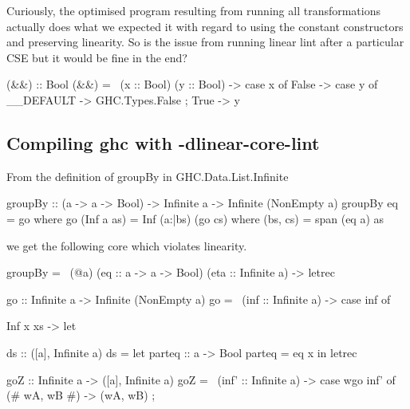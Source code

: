 \documentclass[a4paper, draft]{article}
\begin{document}
\begin{code}
Curiously, the optimised program resulting from running all transformations
actually does what we expected it with regard to using the constant constructors
and preserving linearity. So is the issue from running linear lint after a
particular CSE but it would be fine in the end?
\begin{code}
(&&) :: Bool %
(&&) = \ (x :: Bool) (y :: Bool) ->
  case x of {
    False -> case y of { __DEFAULT -> GHC.Types.False };
    True -> y
  }
\end{code}

\subsection{Compiling ghc with -dlinear-core-lint}

From the definition of groupBy in GHC.Data.List.Infinite
\begin{code}
groupBy :: (a -> a -> Bool) -> Infinite a -> Infinite (NonEmpty a)
groupBy eq = go
  where
    go (Inf a as) = Inf (a:|bs) (go cs)
      where (bs, cs) = span (eq a) as
\end{code}
we get the following core which violates linearity.
\begin{code}
groupBy = \ (@a) (eq :: a -> a -> Bool) (eta :: Infinite a) ->
  letrec {
    go :: Infinite a -> Infinite (NonEmpty a)
    go = \ (inf :: Infinite a) -> case inf of {
      Inf x xs -> let {
        ds :: ([a], Infinite a)
        ds = let {
            parteq :: a -> Bool
            parteq = eq x
        } in
          letrec {
            goZ :: Infinite a -> ([a], Infinite a)
            goZ = \ (inf' :: Infinite a) -> case wgo inf' of { (# wA, wB #) -> (wA, wB) };

}}}}
\end{code}
\end{code}
\end{document}
